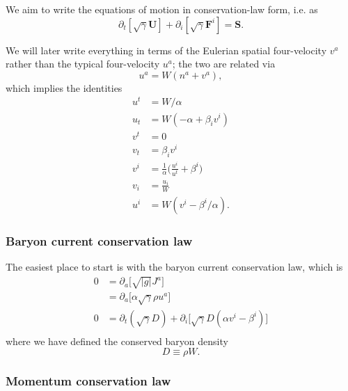 \documentclass[12pt]{article}
\numberwithin{equation}{section}
\begin{document}
We aim to write the equations of motion in conservation-law form, i.e. as
\begin{equation}
\partial_t [\sqrt{\gamma} \bm{U}] + \partial_i [\sqrt{\gamma} \bm{F}^{i}] = \bm{S}.
\end{equation}

We will later write everything in terms of the Eulerian spatial four-velocity $v^a$ rather than the typical four-velocity $u^a$; the two are related via
\begin{equation}
u^a = W (n^a + v^a),
\end{equation}
which implies the identities
\begin{equation}
\begin{aligned}
u^t &= W/\alpha \\
u_t &= W (-\alpha + \beta_i v^i) \\
v^t &= 0 \\
v_t &= \beta_i v^i \\
v^i &= \frac{1}{\alpha} \Big( \frac{u^i}{u^t} + \beta^i \Big) \\
v_i &= \frac{u_i}{W} \\
u^i &= W (v^i - \beta^i/\alpha).
\end{aligned}
\end{equation}

\subsubsection{Baryon current conservation law}

The easiest place to start is with the baryon current conservation law, which is
\begin{equation}
\begin{aligned}
0 &= \partial_a \big[ \sqrt{|g|} J^{a} \big] \\
&= \partial_a \big[ \alpha \sqrt{\gamma} \rho u^a \big] \\
0 &= \partial_t (\sqrt{\gamma} D) + \partial_i \big[ \sqrt{\gamma} D (\alpha v^i - \beta^i) \big] \\
\end{aligned}
\end{equation}
where we have defined the conserved baryon density
\begin{equation}
D \equiv \rho W.
\end{equation}

\subsubsection{Momentum conservation law}
\end{document}
